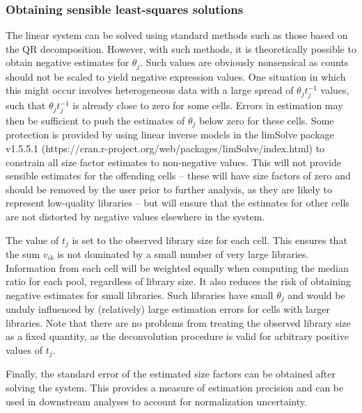 \documentclass{bmcart}
\newcommand{\revised}[1]{#1}
\begin{document}
\subsubsection*{Obtaining sensible least-squares solutions}
The linear system can be solved using standard methods such as those based on the QR decomposition.
However, with such methods, it is theoretically possible to obtain negative estimates for $\theta_j$.
Such values are obviously nonsensical as counts should not be scaled to yield negative expression values.
One situation in which this might occur involves \revised{heterogeneous} data with a large spread of $\theta_jt_j^{-1}$ values, such that $\theta_jt_j^{-1}$ is already close to zero for some cells.
Errors in estimation may then be sufficient to push the \revised{estimates of} $\theta_j$ below zero \revised{for these cells}.
Some protection is provided by using linear inverse models in the limSolve package v1.5.5.1 ({https://cran.r-project.org/web/packages/limSolve/index.html}) \cite{soetaert2009limsolve} to constrain all size factor estimates to non-negative values.
This will not provide sensible estimates for the offending cells 
    -- these will have size factors of zero and should be removed by the user prior to further analysis, as they are likely to represent low-quality libraries 
    -- but will ensure that the estimates for other cells are not distorted by negative values elsewhere in the system.

The value of $t_j$ is set to the observed library size for each cell.
This ensures that the sum \revised{$v_{ik}$} is not dominated by a small number of very large libraries.
Information from each cell will be weighted equally when computing the median ratio for each \revised{pool}, regardless of library size.
It also reduces the risk of obtaining negative estimates for small libraries.
Such libraries have small $\theta_j$ and would be unduly influenced by (relatively) large estimation errors for cells with larger libraries.
Note that there are no problems from treating the observed library size as a fixed quantity, as the deconvolution procedure is valid for arbitrary positive values of $t_j$.

\revised{Finally, the standard error of the estimated size factors can be obtained after solving the system.
This provides a measure of estimation precision and can be used in downstream analyses to account for normalization uncertainty.}
\end{document}
